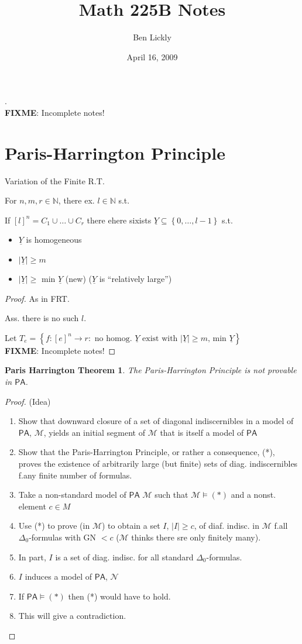 \documentclass[12pt]{article}
\author{Ben Lickly}
\date{April 16, 2009}
\title{Math 225B Notes}
\newcommand{\Nat}{\ensuremath{\mathbb{N}}}
\newcommand{\PA}{\ensuremath{\mathsf{PA}}}
\newcommand{\fixme}{\\ \textbf{FIXME}: Incomplete notes!}
\begin{document}
\maketitle
.
\fixme

\section{Paris-Harrington Principle}
Variation of the Finite R.T.

For $n, m, r \in \Nat$, there ex. $l \in \Nat$ s.t.

If $[l]^n = C_1 \cup \dots \cup C_r$
there ehere sixists $\underline{Y} \subseteq \left\{ 0, \dots, l-1 \right\}$ s.t.
\begin{itemize}
  \item $\underline{Y}$ is homogeneous
  \item $|\underline{Y}| \ge m$
  \item $|\underline{Y}| \ge$ min $\underline{Y}$ (new) 
    ($\underline{Y}$ is ``relatively large'')
\end{itemize}


\begin{proof}
  As in FRT.

  Ass. there is  no such $l$.

  Let $T_e = \left\{ f : [e]^n \rightarrow r : \text{ no homog. $\underline{Y}$ exist with $|\underline{Y}| \ge m$, min $\underline{Y}$} \right\}$
  \fixme
\end{proof}

\newtheorem*{parhar}{Paris Harrington Theorem}
\begin{parhar}
  The Paris-Harrington Principle is not provable in $\PA$.
\end{parhar}
\begin{proof}
  (Idea)
\begin{enumerate}
  \item Show that downward closure of a set of diagonal indiscernibles in a model of $\PA$, $\mathcal{M}$, yields an initial segment of $\mathcal{M}$ that is itself a model of $\PA$
  \item Show that the Paris-Harrington Principle, or rather a consequence, (*), proves the existence of arbitrarily large (but finite) sets of diag. indiscernibles f.any finite number of formulas.
  \item Take a non-standard model of $\PA$ $\mathcal{M}$ such  that 
    $\mathcal{M} \models (*)$ and a nonst. element $c \in M$
  \item Use (*) to prove (in $\mathcal{M}$) to obtain a set $I$, $|I| \ge c$,
    of diaf. indisc. in $\mathcal{M}$ f.all $\Delta_0$-formulas with GN $< c$
    ($\mathcal{M}$ thinks there sre only finitely many).
  \item In part, $I$ is a set of diag. indisc. for all standard $\Delta_0$-formulas.
  \item $I$ induces a model of $\PA$, $\mathcal{N}$
  \item If $\PA \models (*)$ then (*) would have to hold.
  \item This will give a contradiction. 
\end{enumerate}
\end{proof}
\end{document}
